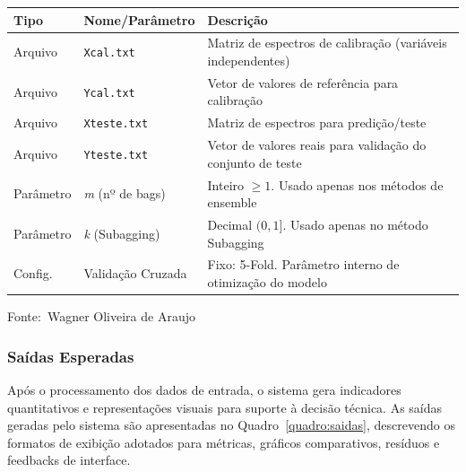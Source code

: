 \documentclass[12pt,a4paper]{article}
\newcommand{\oautor}{Wagner Oliveira de Araujo}
\begin{document}
\begin{quadro}[ht]
\centering
\small
\caption{Entradas necessárias para execução do sistema}
\label{quadro:entradas}
\begin{threeparttable}
\begin{tabularx}{\textwidth}{|l|l|X|} \hline
\textbf{Tipo} & \textbf{Nome/Parâmetro} & \textbf{Descrição} \\ \hline
Arquivo & \texttt{Xcal.txt} & Matriz de espectros de calibração (variáveis independentes) \\ \hline
Arquivo & \texttt{Ycal.txt} & Vetor de valores de referência para calibração \\ \hline
Arquivo & \texttt{Xteste.txt} & Matriz de espectros para predição/teste \\ \hline
Arquivo & \texttt{Yteste.txt} & Vetor de valores reais para validação do conjunto de teste \\ \hline
Parâmetro & \textit{m} (nº de bags) & Inteiro $\ge 1$. Usado apenas nos métodos de ensemble \\ \hline
Parâmetro & \textit{k} (Subagging) & Decimal $(0, 1]$. Usado apenas no método Subagging \\ \hline
Config. & Validação Cruzada & Fixo: 5-Fold. Parâmetro interno de otimização do modelo \\ \hline
\end{tabularx}
\begin{tablenotes}[flushleft]
\footnotesize
\item Fonte:~\oautor
\end{tablenotes}
\end{threeparttable}
\end{quadro}

\subsubsection{Saídas Esperadas}

Após o processamento dos dados de entrada, o sistema gera indicadores quantitativos e representações visuais para suporte à decisão técnica. As saídas geradas pelo sistema são apresentadas no Quadro~\ref{quadro:saidas}, descrevendo os formatos de exibição adotados para métricas, gráficos comparativos, resíduos e feedbacks de interface.
\end{document}
